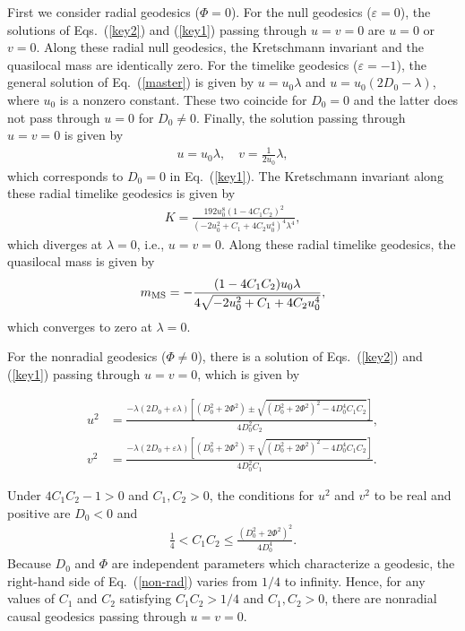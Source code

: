 \documentclass[aps,prd,twocolumn,eqsecnum,showpacs,amsmath]{revtex4}
\begin{document}
First we consider radial geodesics ($\Phi=0$).
For the null geodesics ($\varepsilon=0$), the solutions of Eqs.~(\ref{key2}) and (\ref{key1}) passing through $u=v=0$ are $u=0$ or $v=0$.
Along these radial null geodesics, the Kretschmann invariant and the quasilocal mass are identically zero. 
For the timelike geodesics ($\varepsilon=-1$), the general solution of Eq.~(\ref{master}) is given by $u=u_0\lambda$ and $u=u_0(2D_0-\lambda)$, where $u_0$ is a nonzero constant.
These two coincide for $D_0=0$ and the latter does not pass through $u=0$ for $D_0 \ne 0$.
Finally, the solution passing through $u=v=0$ is given by 
\begin{align}
u=u_0\lambda, \quad v=\frac{1}{2u_0}\lambda, \label{t-radial}
\end{align}  
which corresponds to $D_0=0$ in Eq.~(\ref{key1}).
The Kretschmann invariant along these radial timelike geodesics is given by 
\begin{eqnarray}
K=\frac{192u_0^8(1-4C_1C_2)^2}{(-2u_0^2+C_1+4C_2u_0^4)^4\lambda^4},
\end{eqnarray}
which diverges at $\lambda=0$, i.e., $u=v=0$.
Along these radial timelike geodesics, the quasilocal mass is given by
\begin{eqnarray}
m_{\rm MS}=-\frac{(1-4C_1C_2)u_0\lambda}{4\sqrt{-2u_0^2+C_1+4C_2u_0^4}},
\end{eqnarray}
which converges to zero at $\lambda=0$.



For the nonradial geodesics ($\Phi \ne 0$), there is a solution of Eqs.~(\ref{key2}) and (\ref{key1}) passing through $u=v=0$, which is given by
\begin{widetext}
\begin{align}
u^2&=\frac{-\lambda(2D_0+\varepsilon \lambda)[(D_0^2+2\Phi^2)\pm\sqrt{(D_0^2+2\Phi^2)^2-4D_0^4C_1C_2}]}{4D_0^2C_2}, \label{u} \\
v^2&=\frac{-\lambda(2D_0+\varepsilon \lambda)[(D_0^2+2\Phi^2)\mp\sqrt{(D_0^2+2\Phi^2)^2-4D_0^4C_1C_2}]}{4D_0^2C_1}. \label{v}
\end{align}  
\end{widetext}
Under $4C_1C_2-1>0$ and $C_1, C_2>0$, the conditions for $u^2$ and $v^2$ to be real and positive are $D_0<0$ and 
\begin{align}
\frac14<C_1C_2 \le \frac{(D_0^2+2\Phi^2)^2}{4D_0^4}.\label{non-rad}
\end{align}  
Because $D_0$ and $\Phi$ are independent parameters which characterize a geodesic, the right-hand side of Eq.~(\ref{non-rad}) varies from $1/4$ to infinity.
Hence, for any values of $C_1$ and $C_2$ satisfying $C_1C_2>1/4$ and $C_1, C_2>0$, there are nonradial causal geodesics passing through $u=v=0$.
\end{document}
